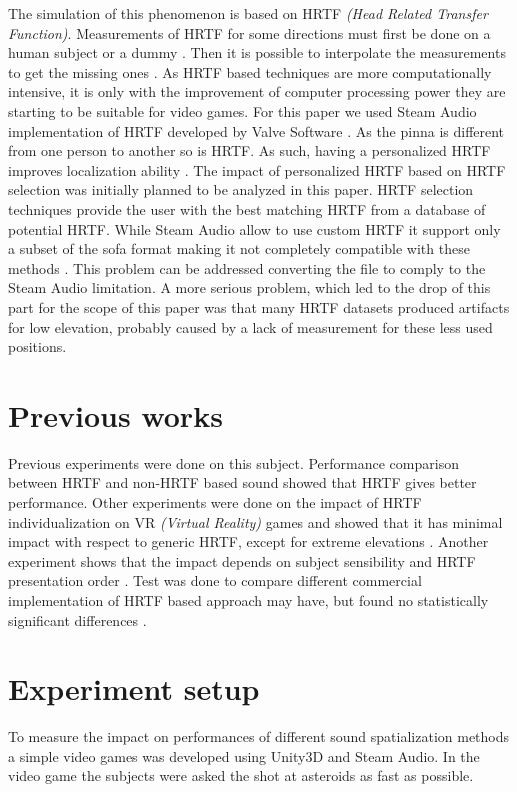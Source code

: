 \documentclass[conference]{IEEEtran}
\begin{document}
The simulation of this phenomenon is based on HRTF \textit{(Head Related Transfer Function)}.
Measurements of HRTF for some directions must first be done on a human subject or a dummy \cite{b5}.
Then it is possible to interpolate the measurements to get the missing ones \cite{b6}.
As HRTF based techniques are more computationally intensive, it is only with the improvement of computer processing power they are starting to be suitable for video games.
For this paper we used Steam Audio implementation of HRTF developed by Valve Software \cite{b7}.
As the pinna is different from one person to another so is HRTF. As such, having a personalized HRTF improves localization ability \cite{b8}. The impact of personalized HRTF based on HRTF selection was initially planned to be analyzed in this paper. HRTF selection techniques provide the user with the best matching HRTF from a database of potential HRTF. While Steam Audio allow to use custom HRTF it support only a subset of the sofa format making it not completely compatible with these methods \cite{b9}. This problem can be addressed converting the file to comply to the Steam Audio limitation. A more serious problem, which led to the drop of this part for the scope of this paper was that many HRTF datasets produced artifacts for low elevation, probably caused by a lack of measurement for these less used positions.

\section{Previous works}
Previous experiments were done on this subject.
Performance comparison between HRTF and non-HRTF based sound showed that HRTF gives better performance\cite{b10}.
Other experiments were done on the impact of HRTF individualization on VR \textit{(Virtual Reality)} games and showed that it has minimal impact with respect to generic HRTF, except for extreme elevations \cite{b11}.
Another experiment shows that the impact depends on subject sensibility and HRTF presentation order \cite{b12}.
Test was done to compare different commercial implementation of HRTF based approach may have, but found no statistically significant differences \cite{b13}. 

\section{Experiment setup}
To measure the impact on performances of different sound spatialization methods a simple video games was developed using Unity3D and Steam Audio.
In the video game the subjects were asked the shot at asteroids as fast as possible.
\end{document}
